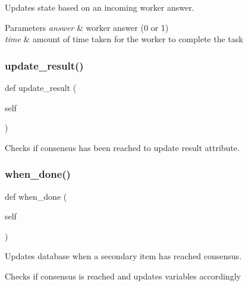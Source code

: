 Updates state based on an incoming worker answer. 


\begin{DoxyParams}{Parameters}
{\em answer} & worker answer (0 or 1) \\
\hline
{\em time} & amount of time taken for the worker to complete the task \\
\hline
\end{DoxyParams}
\mbox{\label{classjoinapp_1_1models_1_1task__management__models_1_1_sec_pred_task_a9013f18300fef58695383b65dd3ad816}} 
\subsubsection{\texorpdfstring{update\_result()}{update\_result()}}
{\footnotesize\ttfamily def update\+\_\+result (\begin{DoxyParamCaption}\item[{}]{self }\end{DoxyParamCaption})}



Checks if consensus has been reached to update result attribute. 

\mbox{\label{classjoinapp_1_1models_1_1task__management__models_1_1_sec_pred_task_a42e95b015208d401475b371d508ffd50}} 
\subsubsection{\texorpdfstring{when\_done()}{when\_done()}}
{\footnotesize\ttfamily def when\+\_\+done (\begin{DoxyParamCaption}\item[{}]{self }\end{DoxyParamCaption})}



Updates database when a secondary item has reached consensus. 

\begin{DoxyVerb}Checks if consensus is reached and updates variables accordingly
\end{DoxyVerb}
 

